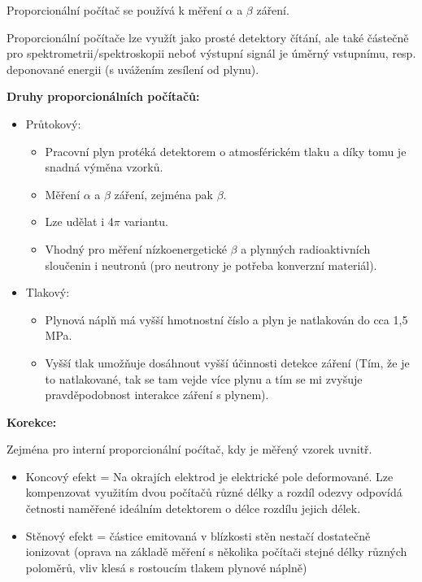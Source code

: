 Proporcionální počítač se používá k měření $\alpha$ a $\beta$ záření.

Proporcionální počítače lze využít jako prosté detektory čítání, ale také částečně pro spektrometrii/spektroskopii neboť výstupní signál je úměrný vstupnímu, resp. deponované energii (s uvážením zesílení od plynu).

\textbf{Druhy proporcionálních počítačů:}

\begin{itemize}

    \item Průtokový: 

        \begin{itemize}
            \item Pracovní plyn protéká detektorem o atmosférickém tlaku a díky tomu je snadná výměna vzorků.
            \item Měření $\alpha$ a $\beta$ záření, zejména pak $\beta$.
            \item Lze udělat i 4$\pi$ variantu.
            \item Vhodný pro měření nízkoenergetické $\beta$ a plynných radioaktivních sloučenin i neutronů (pro neutrony je potřeba konverzní materiál).
        \end{itemize}
    
    \item Tlakový: 

        \begin{itemize}
            \item Plynová náplň má vyšší hmotnostní číslo a plyn je natlakován do cca 1,5 MPa.
            \item Vyšší tlak umožňuje dosáhnout vyšší účinnosti detekce záření (Tím, že je to natlakované, tak se tam vejde více plynu a tím se mi zvyšuje pravděpodobnost interakce záření s plynem).
        \end{itemize}

\end{itemize}


\textbf{Korekce:}

Zejména pro interní proporcionální poćítač, kdy je měřený vzorek uvnitř.

\begin{itemize}
    \item Koncový efekt = Na okrajích elektrod je elektrické pole deformované. Lze kompenzovat využitím dvou počítačů různé délky a rozdíl odezvy odpovídá četnosti naměřené ideálním detektorem o délce rozdílu jejich délek.
    \item Stěnový efekt = částice emitovaná v blízkosti stěn nestačí dostatečně ionizovat (oprava na základě měření s několika počítači stejné délky různých poloměrů, vliv klesá s rostoucím tlakem plynové náplně)
\end{itemize}

